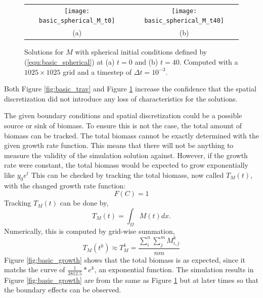   \begin{figure}
    \centering
    \begin{tabular}{c c}
      \texttt{[image: basic\_spherical\_M\_t0]} & 
      \texttt{[image: basic\_spherical\_M\_t40]} \\
      (a) & (b)
    \end{tabular}
    \caption{Solutions for $M$ with spherical initial conditions defined by (\ref{equ:basic_spherical}) at (a) $t = 0$ and (b) $t = 40$. Computed with a $1025 \times 1025$ grid and a timestep of $\Delta t = 10^{-3}$.}
    \label{fig:basic_spherical}
  \end{figure}
  
  Both Figure \ref{fig:basic_trav} and Figure \ref{fig:basic_spherical} increase the confidence that the spatial discretization did not introduce any loss of characteristics for the solutions.
    
  The given boundary conditions and spatial discretization could be a possible source or sink of biomass.
  To ensure this is not the case, the total amount of biomass can be tracked.
  The total biomass cannot be exactly determined with the given growth rate function.
  This means that there will not be anything to measure the validity of the simulation solution against.
  However, if the growth rate were constant, the total biomass would be expected to grow exponentially like $y_0 e^t$
  This can be checked by tracking the total biomass, now called $T_{M}(t)$, with the changed growth rate function:
  \begin{equation} \label{equ:F_constant}
    F(C) = 1
  \end{equation}
  Tracking $T_{M}(t)$ can be done by,
  \begin{equation} \label{equ:total_biomass}
    T_{M}(t) = \int_{\Omega} M(t) dx.
  \end{equation}
  Numerically, this is computed by  grid-wise summation,
  \begin{equation}
    T_{M}(t^k) \approx T_{M}^{k} = \frac{ \sum^n_i \sum^m_j M^{k}_{i,j} }{nm}
  \end{equation}
  Figure \ref{fig:basic_growth} shows that the total biomass is as expected, since it matchs the curve of $\frac{1}{3812.5}*e^{k}$, an exponential function.
  The simulation results in Figure \ref{fig:basic_growth} are from the same as Figure \ref{fig:basic_spherical} but at later times so that the boundary effects can be observed.

